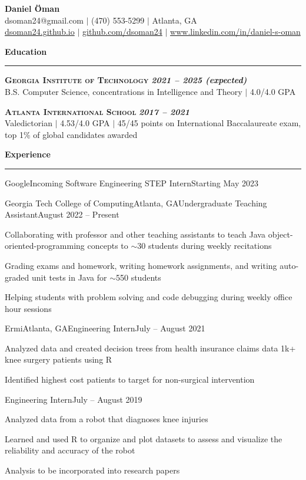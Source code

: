\documentclass{article}
\newcommand{\horizontal}{\vspace{3pt}\hrule}
\newcommand{\school}[3]{\vspace{3pt}\textsc{\textbf{#1}} \hfill \textbf{\textit{#2}} \\ #3}
\newcommand{\sectitle}[1]{\vspace{3pt} \textbf{\large #1} \horizontal}
\begin{document}
\thispagestyle{empty}
\begin{center}
    \textbf{\LARGE Daniel Öman} \\
    dsoman24@gmail.com $|$ (470) 553-5299 $|$ Atlanta, GA \\
    \href{https://dsoman24.github.io/}{dsoman24.github.io} $|$ \href{https://github.com/dsoman24}{github.com/dsoman24} $|$ \href{https://www.linkedin.com/in/daniel-s-oman/}{www.linkedin.com/in/daniel-s-oman}
\end{center}

\begin{flushleft}
\sectitle{Education}

\school{Georgia Institute of Technology}{2021 -- 2025 (expected)}
{B.S. Computer Science, concentrations in Intelligence and Theory $|$ 4.0/4.0 GPA}

\school{Atlanta International School}{2017 -- 2021}
{Valedictorian $|$ 4.53/4.0 GPA $|$ 45/45 points on International Baccalaureate exam, top 1\% of global candidates awarded}

\sectitle{Experience}

    \begin{experience_no_list}{Google}{}{Incoming Software Engineering STEP Intern}{Starting May 2023}
    \end{experience_no_list}

    \begin{experience}{Georgia Tech College of Computing}{Atlanta, GA}{Undergraduate Teaching Assistant}{August 2022 -- Present}
        \item Collaborating with professor and other teaching assistants to teach Java object-oriented-programming concepts to $\sim$30 students during weekly recitations
        \item Grading exams and homework, writing homework assignments, and writing auto-graded unit tests in Java for $\sim$550 students
        \item Helping students with problem solving and code debugging during weekly office hour sessions
    \end{experience}

    \begin{experience}{Ermi}{Atlanta, GA}{Engineering Intern}{July -- August 2021}
        \item Analyzed data and created decision trees from health insurance claims data 1k+ knee surgery patients using R
        \item Identified highest cost patients to target for non-surgical intervention
    \end{experience}
    \begin{subexperience}{Engineering Intern}{July -- August 2019}
        \item Analyzed data from a robot that diagnoses knee injuries
        \item Learned and used R to organize and plot datasets to assess and visualize the reliability and accuracy of the robot
        \item Analysis to be incorporated into research papers
    \end{subexperience}


\end{flushleft}
\end{document}

